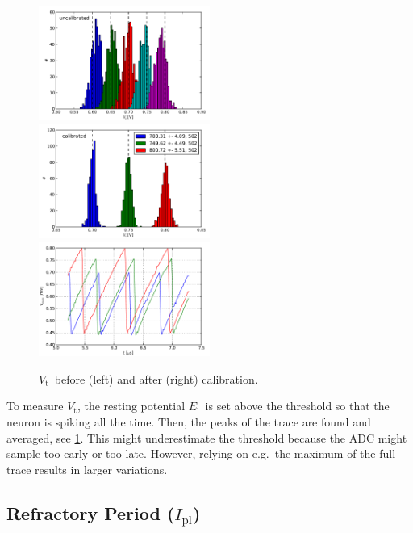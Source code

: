 \documentclass[12pt,a4paper,bibliography=totocnumbered,listof=totocnumbered, DIV12]{scrartcl}
\newcommand{\el}{\ensuremath{E_{\text{l}}}}
\newcommand{\ipl}{\ensuremath{I_{\text{pl}}}}
\newcommand{\vt}{\ensuremath{V_{\text{t}}}}
\begin{document}
\begin{figure}
  \centering
  \includegraphics[width=0.5\textwidth]{figures/V_t_uncalibrated_without_defects}%
  \includegraphics[width=0.5\textwidth]{figures/V_t_calibrated_without_defects}\\
  \includegraphics[width=0.5\textwidth]{figures/V_t_trace}
  \caption{\vt\ before (left) and after (right) calibration.}
  \label{fig:v_t_calibration}
\end{figure}

To measure \vt, the resting potential \el\ is set
above the threshold so that the neuron is spiking all the time.  Then,
the peaks of the trace are found and averaged, see \cref{fig:v_t_calibration}. This might
underestimate the threshold because the ADC might sample too early or
too late. However, relying on e.g.\ the maximum of the full trace
results in larger variations.

\subsection{Refractory Period (\ipl)}
\end{document}
